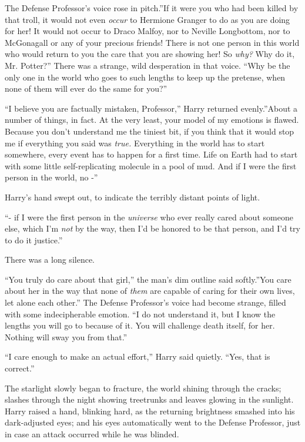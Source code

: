 The Defense Professor's voice rose in pitch.''If it were you who had
been killed by that troll, it would not even \emph{occur} to Hermione
Granger to do as you are doing for her! It would not occur to Draco
Malfoy, nor to Neville Longbottom, nor to McGonagall or any of your
precious friends! There is not one person in this world who would return
to you the care that you are showing her! So \emph{why?} Why do it, Mr.
Potter?'' There was a strange, wild desperation in that voice. ``Why be
the only one in the world who goes to such lengths to keep up the
pretense, when none of them will ever do the same for you?''

``I believe you are factually mistaken, Professor,'' Harry returned
evenly.''About a number of things, in fact. At the very least, your
model of my emotions is flawed. Because you don't understand me the
tiniest bit, if you think that it would stop me if everything you said
was \emph{true.} Everything in the world has to start somewhere, every
event has to happen for a first time. Life on Earth had to start with
some little self-replicating molecule in a pool of mud. And if I were
the first person in the world, no -''

Harry's hand swept out, to indicate the terribly distant points of
light.

``- if I were the first person in the \emph{universe} who ever really
cared about someone else, which I'm \emph{not} by the way, then I'd be
honored to be that person, and I'd try to do it justice.''

There was a long silence.

``You truly do care about that girl,'' the man's dim outline said
softly.''You care about her in the way that none of \emph{them} are
capable of caring for their own lives, let alone each other.'' The
Defense Professor's voice had become strange, filled with some
indecipherable emotion. ``I do not understand it, but I know the lengths
you will go to because of it. You will challenge death itself, for her.
Nothing will sway you from that.''

``I care enough to make an actual effort,'' Harry said quietly. ``Yes,
that is correct.''

The starlight slowly began to fracture, the world shining through the
cracks; slashes through the night showing treetrunks and leaves glowing
in the sunlight. Harry raised a hand, blinking hard, as the returning
brightness smashed into his dark-adjusted eyes; and his eyes
automatically went to the Defense Professor, just in case an attack
occurred while he was blinded.


